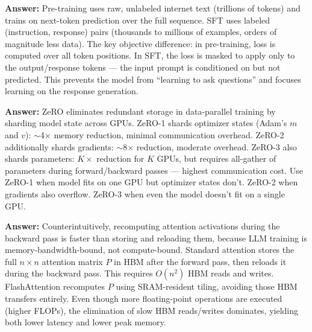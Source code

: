 \documentclass[11pt, a4paper]{article}
\begin{document}
\begin{notebox}
\textbf{Answer:} Pre-training uses raw, unlabeled internet text (trillions of tokens) and trains on next-token prediction over the full sequence. SFT uses labeled (instruction, response) pairs (thousands to millions of examples, orders of magnitude less data). The key objective difference: in pre-training, loss is computed over all token positions. In SFT, the loss is masked to apply only to the output/response tokens --- the input prompt is conditioned on but not predicted. This prevents the model from ``learning to ask questions'' and focuses learning on the response generation.
\end{notebox}

\begin{notebox}
\textbf{Answer:} ZeRO eliminates redundant storage in data-parallel training by sharding model state across GPUs. ZeRO-1 shards optimizer states (Adam's $m$ and $v$): $\sim$4$\times$ memory reduction, minimal communication overhead. ZeRO-2 additionally shards gradients: $\sim$8$\times$ reduction, moderate overhead. ZeRO-3 also shards parameters: $K\times$ reduction for $K$ GPUs, but requires all-gather of parameters during forward/backward passes --- highest communication cost. Use ZeRO-1 when model fits on one GPU but optimizer states don't. ZeRO-2 when gradients also overflow. ZeRO-3 when even the model doesn't fit on a single GPU.
\end{notebox}

\begin{notebox}
\textbf{Answer:} Counterintuitively, recomputing attention activations during the backward pass is faster than storing and reloading them, because LLM training is memory-bandwidth-bound, not compute-bound. Standard attention stores the full $n \times n$ attention matrix $P$ in HBM after the forward pass, then reloads it during the backward pass. This requires $O(n^2)$ HBM reads and writes. FlashAttention recomputes $P$ using SRAM-resident tiling, avoiding those HBM transfers entirely. Even though more floating-point operations are executed (higher FLOPs), the elimination of slow HBM reads/writes dominates, yielding both lower latency and lower peak memory.
\end{notebox}
\end{document}
